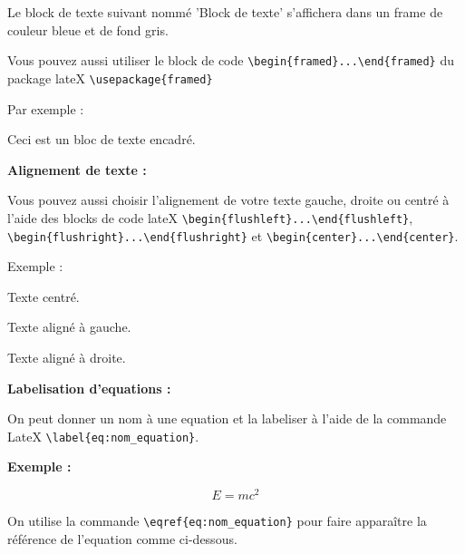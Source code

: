 \documentclass[
  12pt,
]{article}
\begin{document}
\begin{tcolorbox}[colframe = blue, colback = gray, title = Block de texte ]

Le block de texte suivant nommé 'Block de texte' s'affichera dans un frame de couleur bleue et de fond gris.

\end{tcolorbox}

Vous pouvez aussi utiliser le block de code
\texttt{\textbackslash{}begin\{framed\}...\textbackslash{}end\{framed\}}
du package lateX \texttt{\textbackslash{}usepackage\{framed\}}

Par exemple :

\begin{framed}

Ceci est un bloc de texte encadré.

\end{framed}

\textbf{Alignement de texte :}

Vous pouvez aussi choisir l'alignement de votre texte gauche, droite ou
centré à l'aide des blocks de code lateX
\texttt{\textbackslash{}begin\{flushleft\}...\textbackslash{}end\{flushleft\}},
\texttt{\textbackslash{}begin\{flushright\}...\textbackslash{}end\{flushright\}}
et
\texttt{\textbackslash{}begin\{center\}...\textbackslash{}end\{center\}}.

Exemple :

\begin{center}
Texte centré.
\end{center}

\begin{flushleft}
Texte aligné à gauche.
\end{flushleft}

\begin{flushright}
Texte aligné à droite.
\end{flushright}

\textbf{Labelisation d'equations :}

On peut donner un nom à une equation et la labeliser à l'aide de la
commande LateX \texttt{\textbackslash{}label\{eq:nom\_equation\}}.

\textbf{Exemple :}

\begin{equation}
E = mc^2
\label{eq:emc2}
\end{equation}

On utilise la commande
\texttt{\textbackslash{}eqref\{eq:nom\_equation\}} pour faire apparaître
la référence de l'equation comme ci-dessous.
\end{document}
